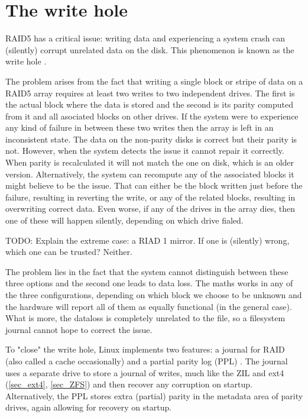     \section{The write hole}
        \label{sec_RAID_problems}

        RAID5 has a critical issue: writing data and experiencing a system
        crash can (silently) corrupt unrelated data on the disk. This
        phenomenon is known as the write hole \cite{LWN_md_journal}.

        The problem arises from the fact that writing a single block or stripe
        of data on a RAID5 array requires at least two writes to two
        independent drives. The first is the actual block where the data is
        stored and the second is its parity computed from it and all asociated
        blocks on other drives. If the system were to experience any kind of
        failure in between these two writes then the array is left in an
        inconsistent state. The data on the non-parity disks is correct but
        their parity is not. However, when the system detects the issue it
        cannot repair it correctly. When parity is recalculated it will not
        match the one on disk, which is an older version. Alternatively, the
        system can recompute any of the associated blocks it might believe to
        be the issue. That can either be the block written just before the
        failure, resulting in reverting the write, or any of the related
        blocks, resulting in overwriting correct data. Even worse, if any of
        the drives in the array dies, then one of these will happen silently,
        depending on which drive fialed.

        TODO:
        Explain the extreme case: a RIAD 1 mirror. If one is (silently) wrong,
        which one can be trusted? Neither.

        The problem lies in the fact that the system cannot distinguish between
        these three options and the second one leads to data loss. The maths
        works in any of the three configurations, depending on which block we
        choose to be unknown and the hardware will report all of them as
        equally functional (in the general case). What is more, the dataloss is
        completely unrelated to the file, so a filesystem journal cannot hope
        to correct the issue.

        To "close" the write hole, Linux implements two features: a journal for
        RAID \cite{LWN_md_journal} (also called a cache occasionally) and a
        partial parity log (PPL) \cite{partial_parity_log}.
        The journal uses a separate drive to store a journal of writes, much
        like the ZIL and ext4 (\ref{sec_ext4}, \ref{sec_ZFS}) and then recover
        any corruption on startup. Alternatively, the PPL stores extra
        (partial) parity in the metadata area of parity drives, again allowing
        for recovery on startup.

